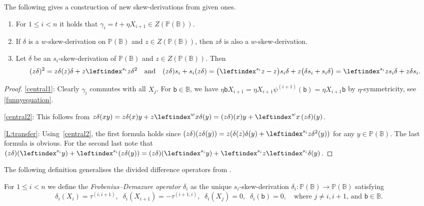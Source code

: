 \documentclass[a4paper,11pt]{amsart}
\numberwithin{equation}{subsection}
\theoremstyle{definition}
\theoremstyle{theorem}
\theoremstyle{remark}
\newcommand\bb{\mathsf{b}}
\newcommand\Po{\mathbb{P}(\mathbb{B})}
\newcommand{\Bo}{\mathbb{B}}
\begin{document}
\begin{Lemma}\label{L:gammacentral}
The following gives a construction of new skew-derivations from given ones.
\begin{enumerate}
\item \label{central1} For $1\le i<n$ it holds that  $\gamma_i=t+\eta X_{i+1}\in Z(\Po)$.
\item  \label{central2}  If $\delta$ is a $w$-skew-derivation on $\Po$ and $z\in Z(\Po)$, then
  $z\delta$ is also a $w$-skew-derivation.
  \item\label{L:transfer}
  Let $\delta$ be an $s_i$-skew-derivation of $\Po$ and $z\in Z(\Po)$. Then
  \begin{equation}\label{transfer}
    (z\delta)^2=z\delta(z)\delta+z\leftindex^{s_i}z\delta^2
    \quad\text{and}\quad
    (z\delta)s_i+s_i(z\delta)
      =\bigl(\leftindex^{s_i}z-z\bigr)s_i\delta+z\bigl(\delta s_i+s_i\delta\bigr)=\leftindex^{s_i}zs_i\delta+z\delta s_i.
  \end{equation}
  \end{enumerate}
\end{Lemma}
\begin{proof}
  \autoref{central1}: Clearly $\gamma_i$ commutes with all $X_j$.
  For $\bb\in\Bo$, we have
  $\eta\bb X_{i+1}=\eta X_{i+1}\psi^{(i+1)}(\bb)=\eta X_{i+1}\bb$  by $\eta$-symmetricity,
  see \autoref{funnyequation}.

   \autoref{central2}: This follows from
  $z\delta(xy)=z\delta(x)y+z\leftindex^wx\delta(y)
  =(z\delta)(x)y+\leftindex^wx\,(z\delta)(y)$.

   \autoref{L:transfer}: Using~\autoref{central2}, the first formula holds since
  $(z\delta)(z\delta(y))=z(\delta(z)\delta(y)+\leftindex^{s_i}z\delta^2(y))$ for any $y\in\Po$. The last formula is obvious. For the second last note that
  $(z\delta)(\leftindex^{s_i}y)+\leftindex^{s_i}{\left(z\delta(y)\right)}
   =(z\delta)(\leftindex^{s_i}y)+\leftindex^{s_i}z\leftindex^{s_i}\delta(y)$.
   \end{proof}

The following definition generalises the divided difference operators from  \cite{Savage:AffineWreath,RossoSavage:QuantumAffineWreath}.
\begin{Definition}\label{D:FrobDem}
  For $1\le i<n$ we define the \emph{Frobenius--Demazure operator}
  $\delta_i$ as the unique $s_i$-skew-derivation
  $\delta_i\colon\Po\to\Po$ satisfying
  \begin{equation}\label{deltavalues}
    \delta_i(X_i)=\tau^{(i,i+1)},\;\;
    \delta_i(X_{i+1})=-\tau^{(i+1,i)},\;\;
    \delta_i(X_j)=0,\;\;
    \delta_i(\bb)=0,
    \quad\text{where $j\not=i,i+1$, and $\bb\in\Bo$.}
  \end{equation}
\end{Definition}
\end{document}
